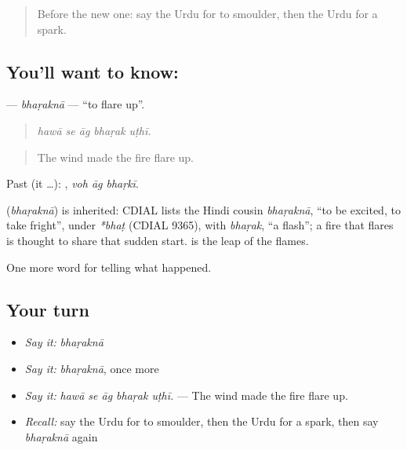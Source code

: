 \label{lesson:UR-C287-bharakna}



\begin{quote}
Before the new one: say the Urdu for to smoulder, then the Urdu for a spark.
\end{quote}

\subsection*{You'll want to know: }
\textbf{} — \emph{bhaṛaknā} — \textquotedblleft{}to flare up\textquotedblright{}.

\begin{quote}
    
\end{quote}

\begin{quote}
\emph{hawā se āg bhaṛak uṭhī.}
\end{quote}

\begin{quote}
The wind made the fire flare up.
\end{quote}

Past (it …):   , \emph{voh āg bhaṛkī}.

\begin{cousinweb}
\textbf{} (\emph{bhaṛaknā}) is inherited: CDIAL lists the Hindi cousin \emph{bhaṛaknā}, \textquotedblleft{}to be excited, to take fright\textquotedblright{}, under \emph{*bhaṭ} (CDIAL 9365), with \emph{bhaṛak}, \textquotedblleft{}a flash\textquotedblright{}; a fire that flares is thought to share that sudden start. \textbf{ } is the leap of the flames.
\end{cousinweb}

\begin{grammarlens}[title={What you've built}]
One more word for telling what happened.
\end{grammarlens}

\subsection*{Your turn}
\begin{itemize}
\raggedright
  \item \emph{Say it:} \emph{bhaṛaknā}
  \item \emph{Say it:} \emph{bhaṛaknā}, once more
  \item \emph{Say it:} \emph{hawā se āg bhaṛak uṭhī.} — The wind made the fire flare up.
  \item \emph{Recall:} say the Urdu for to smoulder, then the Urdu for a spark, then say \emph{bhaṛaknā} again
\end{itemize}

